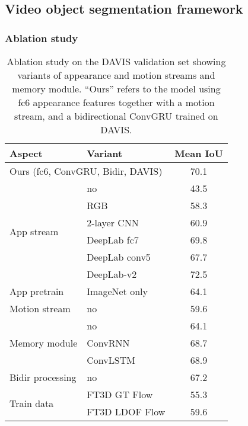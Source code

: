 \subsection{Video object segmentation framework}

\subsubsection{Ablation study}
\label{sec:abl}
\begin{table}[t]
\begin{center}
\begin{tabular}{l|l|c}
\hline
Aspect & Variant & Mean IoU  \\
\hline
  \multicolumn{2}{l|}{Ours (fc6, ConvGRU, Bidir, DAVIS)}  & 70.1    \\
  \hline
  \multirow{6}{*}{App stream} & no  & 43.5  \\
   & RGB  & 58.3  \\
   & 2-layer CNN  & 60.9 \\
   & DeepLab fc7  & 69.8  \\
   & DeepLab conv5  & 67.7  \\
   & DeepLab-v2  & 72.5  \\
  \hline
  App pretrain & ImageNet only  & 64.1  \\
  \hline
  Motion stream & no  & 59.6  \\
  \hline
  \multirow{3}{*}{Memory module} & no & 64.1  \\
  & ConvRNN  & 68.7  \\  
  & ConvLSTM  & 68.9  \\  
    \hline
  Bidir processing & no & 67.2  \\
  \hline
     \multirow{2}{*}{Train data} & FT3D GT Flow & 55.3  \\
   & FT3D LDOF Flow & 59.6   \\
  \hline
\end{tabular}
\caption{Ablation study on the DAVIS validation set showing variants of
appearance and motion streams and memory module. ``Ours'' refers to the model
using fc6 appearance features together with a motion stream, and a
bidirectional ConvGRU trained on DAVIS.}
\label{tbl:abl}
\end{center}
\end{table}

